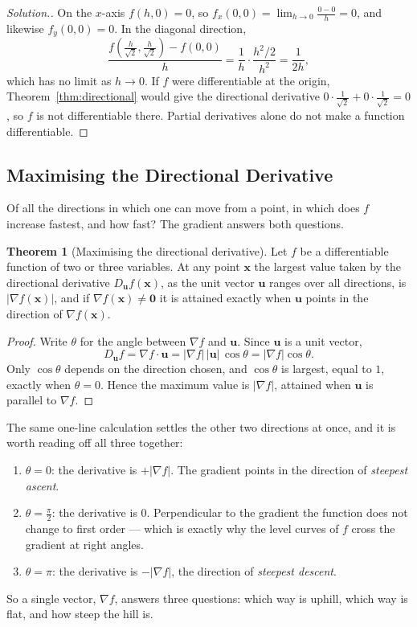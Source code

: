 \documentclass[11pt,a4paper]{article}
\theoremstyle{definition}
\newtheorem{thm}{Theorem}[subsection]
\newenvironment{solution}
  {\renewcommand{\qedsymbol}{}\begin{proof}[\textit{Solution}.]}
  {\end{proof}}
\begin{document}
\begin{solution}
On the $x$-axis $f(h,0) = 0$, so $f_x(0,0) = \lim_{h\to 0}\frac{0-0}{h} = 0$, and
likewise $f_y(0,0) = 0$. In the diagonal direction,
\[\frac{f\left(\frac{h}{\sqrt2},\frac{h}{\sqrt2}\right) - f(0,0)}{h} =
\frac{1}{h}\cdot\frac{h^2/2}{h^2} = \frac{1}{2h},\]
which has no limit as $h\to 0$. If $f$ were differentiable at the origin,
Theorem~\ref{thm:directional} would give the directional derivative
$0\cdot\frac{1}{\sqrt2} + 0\cdot\frac{1}{\sqrt2} = 0$, so $f$ is not
differentiable there. Partial derivatives alone do not make a function
differentiable.
\end{solution}

{\color[wave]{485}\subsection{Maximising the Directional Derivative}}

Of all the directions in which one can move from a point, in which does $f$
increase fastest, and how fast? The gradient answers both questions.

\begin{thm}[Maximising the directional derivative]
\label{thm:maxdir}
Let $f$ be a differentiable function of two or three variables. At any point
$\mathbf x$ the largest value taken by the directional derivative
$D_{\mathbf u}f(\mathbf x)$, as the unit vector $\mathbf u$ ranges over all
directions, is $|\nabla f(\mathbf x)|$, and if $\nabla f(\mathbf x)\neq\mathbf
0$ it is attained exactly when $\mathbf u$ points in the direction of
$\nabla f(\mathbf x)$.
\end{thm}

\begin{proof}
Write $\theta$ for the angle between $\nabla f$ and $\mathbf u$. Since
$\mathbf u$ is a unit vector,
\[D_{\mathbf u} f = \nabla f\cdot\mathbf u = |\nabla f|\,|\mathbf u|\, \cos
\theta = |\nabla f|\cos \theta .\]
Only $\cos\theta$ depends on the direction chosen, and $\cos\theta$ is largest,
equal to $1$, exactly when $\theta = 0$. Hence the maximum value is $|\nabla f|$,
attained when $\mathbf u$ is parallel to $\nabla f$.
\end{proof}

The same one-line calculation settles the other two directions at once, and it
is worth reading off all three together:
\begin{enumerate}
\item[$-$] $\theta = 0$: the derivative is $+|\nabla f|$. The gradient
points in the direction of \emph{steepest ascent}.

\item[$-$] $\theta = \frac{\pi}{2}$: the derivative is $0$. Perpendicular to
the gradient the function does not change to first order --- which is exactly
why the level curves of $f$ cross the gradient at right angles.

\item[$-$] $\theta = \pi$: the derivative is $-|\nabla f|$, the
direction of \emph{steepest descent}.
\end{enumerate}
So a single vector, $\nabla f$, answers three questions: which way is uphill,
which way is flat, and how steep the hill is.
\end{document}
